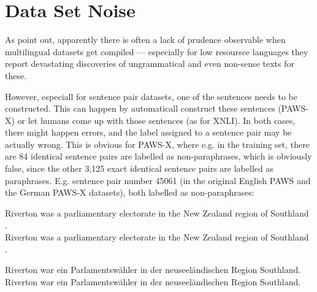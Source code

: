 


\section{Data Set Noise}
\label{sec:label-noise}

As \citep{caswell2021quality} point out, apparently there is often a lack of
prudence observable when multilingual datasets get compiled --- especially for
low resoursce languages they report devastating discoveries of ungrammatical
and even non-sense texts for these.


However, especiall for sentence pair datasets, one of the sentences needs to be constructed. This
can happen by automaticall construct these sentences (PAWS-X) or let humans come up with those
sentences (as for XNLI). In both cases, there might happen errors, and the label assigned to a
sentence pair may be actually wrong. This is obvious for PAWS-X, where e.g. in the training set,
there are 84 identical sentence pairs are labelled as non-paraphrases, which is obviously false,
since the other 3,125 exact identical sentence pairs are labelled as paraphrases. E.g. sentence pair
number 45061 (in the original English PAWS and the German PAWS-X datasets), both labelled as
non-paraphrases:

\begin{examples}
  \item Riverton was a parliamentary electorate in the New Zealand region of Southland .\\
        Riverton was a parliamentary electorate in the New Zealand region of Southland .

  \item Riverton war ein Parlamentswähler in der neuseeländischen Region Southland.\\
        Riverton war ein Parlamentswähler in der neuseeländischen Region Southland.
\end{examples}

